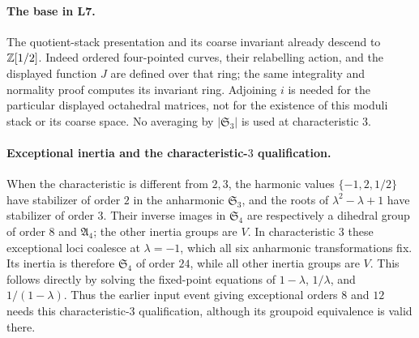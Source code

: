 \paragraph{The base in L7.}
The quotient-stack presentation and its coarse invariant already descend
to ${\mathbb{Z}}[1/2]$. Indeed ordered four-pointed curves, their relabelling
action, and the displayed function $J$ are defined over that ring; the
same integrality and normality proof computes its invariant ring.
Adjoining $i$ is needed for the particular displayed octahedral
matrices, not for the existence of this moduli stack or its coarse
space. No averaging by $|\mathfrak S_3|$ is used at characteristic $3$.

\paragraph{Exceptional inertia and the characteristic-$3$ qualification.}
When the characteristic is different from $2,3$, the harmonic values
$\{-1,2,1/2\}$ have stabilizer of order $2$ in the anharmonic
$\mathfrak S_3$, and the roots of $\lambda^2-\lambda+1$ have
stabilizer of order $3$. Their inverse images in $\mathfrak S_4$
are respectively a dihedral group of order $8$ and $\mathfrak A_4$;
the other inertia groups are $V$. In characteristic $3$ these
exceptional loci coalesce at $\lambda=-1$, which all six
anharmonic transformations fix. Its inertia is therefore
$\mathfrak S_4$ of order $24$, while all other inertia groups are
$V$. This follows directly by solving the fixed-point equations
of $1-\lambda$, $1/\lambda$, and $1/(1-\lambda)$. Thus the
earlier input event giving exceptional orders $8$ and $12$ needs
this characteristic-$3$ qualification, although its groupoid
equivalence is valid there.
